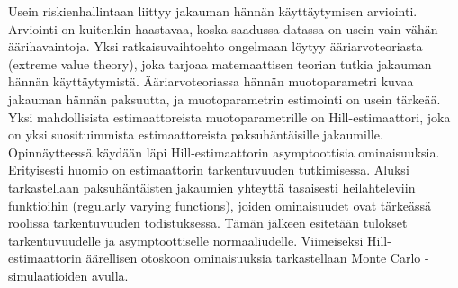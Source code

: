 \documentclass[english,12pt,a4paper,pdftex,sci,utf8]{aaltothesis} %
\date{23.8.2018}
\begin{document}
\makecoverpage

\makecopyrightpage


\begin{abstractpage}[english]
 \abstracttext{} 
\end{abstractpage}


\newpage
\begin{abstractpage}[finnish]
Usein riskienhallintaan liittyy jakauman hännän käyttäytymisen arviointi. Arviointi on kuitenkin haastavaa, koska saadussa datassa on usein vain vähän äärihavaintoja. Yksi ratkaisuvaihtoehto ongelmaan löytyy ääriarvoteoriasta (extreme value theory), joka tarjoaa matemaattisen teorian tutkia jakauman hännän käyttäytymistä. Ääriarvoteoriassa hännän muotoparametri kuvaa jakauman hännän paksuutta, ja muotoparametrin estimointi on usein tärkeää. Yksi mahdollisista estimaattoreista muotoparametrille on Hill-estimaattori, joka on yksi suosituimmista estimaattoreista paksuhäntäisille jakaumille. Opinnäytteessä käydään läpi Hill-estimaattorin asymptoottisia ominaisuuksia. Erityisesti huomio on estimaattorin tarkentuvuuden tutkimisessa. Aluksi tarkastellaan paksuhäntäisten jakaumien yhteyttä tasaisesti heilahteleviin funktioihin (regularly varying functions), joiden ominaisuudet ovat tärkeässä roolissa tarkentuvuuden todistuksessa. Tämän jälkeen esitetään tulokset tarkentuvuudelle ja asymptoottiselle normaaliudelle. Viimeiseksi Hill-estimaattorin äärellisen otoskoon ominaisuuksia tarkastellaan Monte Carlo -simulaatioiden avulla.

\end{abstractpage}
\end{document}
